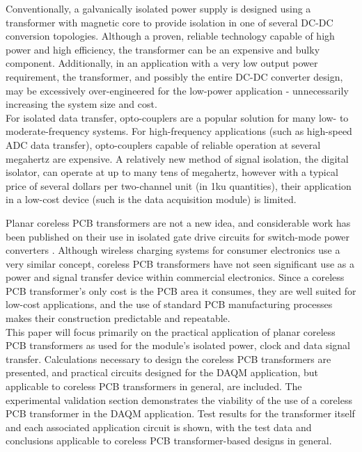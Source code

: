 \documentclass[conference]{IEEEtran}
\begin{document}
Conventionally, a galvanically isolated power supply is designed using a transformer with magnetic core to provide isolation in one of several DC-DC conversion topologies.  Although a proven, reliable technology capable of high power and high efficiency, the transformer can be an expensive and bulky component.  Additionally, in an application with a very low output power requirement, the transformer, and possibly the entire DC-DC converter design, may be excessively over-engineered for the low-power application - unnecessarily increasing the system size and cost.
\\
For isolated data transfer, opto-couplers are a popular solution for many low- to moderate-frequency systems.  For high-frequency applications (such as high-speed ADC data transfer), opto-couplers capable of reliable operation at several megahertz are expensive.  A relatively new method of signal isolation, the digital isolator, can operate at up to many tens of megahertz, however with a typical price of several dollars per two-channel unit (in 1ku quantities), their application in a low-cost device (such is the data acquisition module) is limited.


Planar coreless PCB transformers are not a new idea, and considerable work has been published on their use in isolated gate drive circuits for switch-mode power converters \cite{TangHuiFundamental}\cite{NaturallySoft}\cite{OptimalOperation}\cite{CorelessGateDrive}.  Although wireless charging systems for consumer electronics use a very similar concept, coreless PCB transformers have not seen significant use as a power and signal transfer device within commercial electronics.  Since a coreless PCB transformer's only cost is the PCB area it consumes, they are well suited for low-cost applications, and the use of standard PCB manufacturing processes makes their construction predictable and repeatable.
\\
This paper will focus primarily on the practical application of planar coreless PCB transformers as used for the module's isolated power, clock and data signal transfer.  Calculations necessary to design the coreless PCB transformers are presented, and practical circuits designed for the DAQM application, but applicable to coreless PCB transformers in general, are included.  The experimental validation section demonstrates the viability of the use of a coreless PCB transformer in the DAQM application.  Test results for the transformer itself and each associated application circuit is shown, with the test data and conclusions applicable to coreless PCB transformer-based designs in general.
\end{document}
